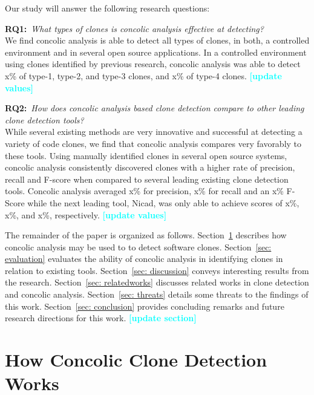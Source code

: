 \documentclass[smallextended]{svjour3}       %
\newcommand{\todo}[1]{\textcolor{cyan}{\textbf{[#1]}}}
\begin{document}
Our study will answer the following research questions:

\textbf{RQ1:}~\emph{What types of clones is concolic analysis effective at detecting?}\\
We find concolic analysis is able to detect all types of clones, in both, a controlled environment and in several open source applications. In a controlled environment using clones identified by previous research, concolic analysis was able to detect x\% of type-1, type-2, and type-3 clones, and x\% of type-4 clones.
\todo{update values}

\textbf{RQ2:}~\emph{How does concolic analysis based clone detection compare to other leading clone detection tools?}\\
While several existing methods are very innovative and successful at detecting a variety of code clones, we find that concolic analysis compares very favorably to these tools. Using manually identified clones in several open source systems, concolic analysis consistently discovered clones with a higher rate of precision, recall and F-score when compared to several leading existing clone detection tools. Concolic analysis averaged x\% for precision, x\% for recall and an x\% F-Score while the next leading tool, Nicad, was only able to achieve scores of x\%, x\%, and x\%, respectively.
\todo{update values}


The remainder of the paper is organized as follows. Section~\ref{sec: howconcolicworks} describes how concolic analysis may be used to to detect software clones. Section~\ref{sec: evaluation} evaluates the ability of concolic analysis in identifying clones in relation to existing tools. Section~\ref{sec: discussion} conveys interesting results from the research. Section~\ref{sec: relatedworks} discusses related works in clone detection and concolic analysis. Section~\ref{sec: threats} details some threats to the findings of this work. Section~\ref{sec: conclusion} provides concluding remarks and future research directions for this work.
\todo{update section}





\vspace{-0.08in}
\section{How Concolic Clone Detection Works}
\label{sec: howconcolicworks}
\end{document}
